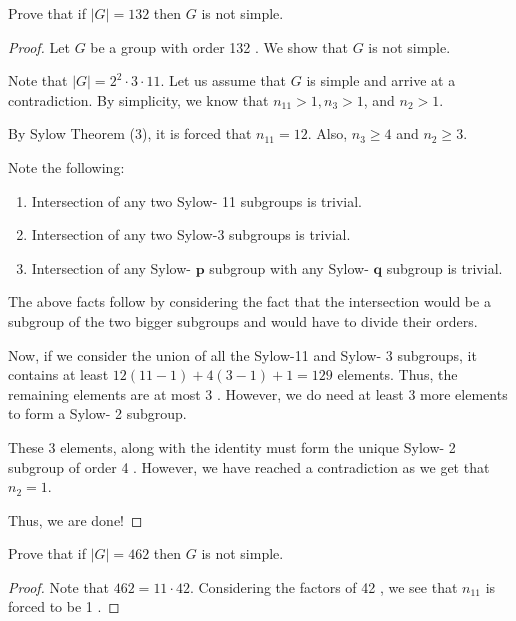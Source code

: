 \begin{exercise}
Prove that if $\lvert G \rvert=132$ then $G$ is not simple.
\end{exercise}
\begin{proof}
Let $G$ be a group with order 132 . We show that $G$ is not simple.

Note that $|G|=2^2 \cdot 3 \cdot 11$. Let us assume that $G$ is simple and arrive at a contradiction. By simplicity, we know that $n_{11}>1, n_3>1$, and $n_2>1$.

By Sylow Theorem (3), it is forced that $n_{11}=12$. Also, $n_3 \geq 4$ and $n_2 \geq 3$.

Note the following:

\begin{enumerate}
	\item Intersection of any two Sylow- 11 subgroups is trivial.
	\item Intersection of any two Sylow-3 subgroups is trivial.
	\item Intersection of any Sylow- $\boldsymbol{p}$ subgroup with any Sylow- $\boldsymbol{q}$ subgroup is trivial.
\end{enumerate}

The above facts follow by considering the fact that the intersection would be a subgroup of the two bigger subgroups and would have to divide their orders.

Now, if we consider the union of all the Sylow-11 and Sylow- 3 subgroups, it contains at least $12(11-1)+4(3-1)+1=129$ elements. Thus, the remaining elements are at most 3 . However, we do need at least 3 more elements to form a Sylow- 2 subgroup.

These 3 elements, along with the identity must form the unique Sylow- 2 subgroup of order 4 . However, we have reached a contradiction as we get that $n_2=1$.

Thus, we are done!

\end{proof}

\begin{exercise}
Prove that if $|G|=462$ then $G$ is not simple.
\end{exercise}
\begin{proof}
Note that $462=11 \cdot 42$. Considering the factors of 42 , we see that $n_{11}$ is forced to be 1 .
\end{proof}

